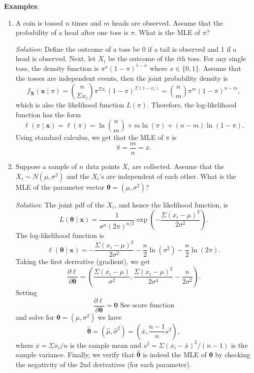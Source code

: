 \documentclass[12pt]{article}
\begin{document}
\textbf{Examples}:
\begin{enumerate}
\item
A coin is tossed $n$ times and $m$ heads are observed.  Assume that the probability of a head after one toss is $\pi$.  What is the MLE of $\pi$?

\emph{Solution}:  Define the outcome of a toss be 0 if a tail is observed and 1 if a head is observed.  Next, let $X_i$ be the outcome of 
the $i$th toss.  For any single toss, the density function is $\pi^x(1-\pi)^{1-x}$ where $x\in \lbrace 0,1\rbrace$.  Assume that the tosses are independent events, then the joint probability density is $$f_{\mathbf{X}}(\boldsymbol{x}\mid\pi)=\binom{n}{\Sigma x_i}\pi^{\Sigma x_i}(1-\pi)^{\Sigma (1-x_i)}=\binom{n}{m}\pi^m(1-\pi)^{n-m},$$
which is also the likelihood function $L(\pi)$.  Therefore, the log-likelihood function has the form $$\ell(\pi\mid\boldsymbol{x})=\ell(\pi)=\operatorname{ln}\binom{n}{m}+m\operatorname{ln}(\pi)+(n-m)\operatorname{ln}(1-\pi).$$  Using standard calculus, we get that the MLE of $\pi$ is $$\hat{\pi}=\frac{m}{n}=\overline{x}.$$

\item
Suppose a sample of $n$ data points $X_i$ are collected.  Assume that the $X_i\sim N(\mu,\sigma^2)$ and the $X_i$'s are independent of each other.  What is the MLE of the parameter vector $\boldsymbol{\theta}=(\mu,\sigma^2)$?

\emph{Solution}:  The joint pdf of the $X_i$, and hence the likelihood function, is $$L(\boldsymbol{\theta}\mid\boldsymbol{x})=\frac{1}{\sigma^n(2\pi)^{n/2}}\operatorname{exp}(-\frac{\Sigma(x_i-\mu)^2}{2\sigma^2}).$$  The log-likelihood function is $$\ell(\boldsymbol{\theta}\mid\boldsymbol{x})=-\frac{\Sigma(x_i-\mu)^2}{2\sigma^2}-\frac{n}{2}\operatorname{ln}(\sigma^2)-\frac{n}{2}\operatorname{ln}(2\pi).$$  Taking the first derivative (gradient), we get $$\frac{\partial\ell}{\partial \boldsymbol{\theta}}=(\frac{\Sigma(x_i-\mu)}{\sigma^2},\frac{\Sigma(x_i-\mu)^2}{2\sigma^4}-\frac{n}{2\sigma^2}).$$  Setting $$\frac{\partial\ell}{\partial \boldsymbol{\theta}}=\boldsymbol{0}\mbox{ See score function}$$ and solve for $\boldsymbol{\theta}=(\mu,\sigma^2)$ we have $$\boldsymbol{\hat{\theta}}=(\hat{\mu},\hat{\sigma}^2)=(\overline{x},\frac{n-1}{n}s^2),$$ where $\overline{x}=\Sigma x_i/n$ is the sample mean and $s^2=\Sigma (x_i-\overline{x})^2/(n-1)$ is the sample variance.  Finally, we verify that $\hat{\boldsymbol{\theta}}$ is indeed the MLE of $\boldsymbol{\theta}$ by checking the negativity of the 2nd derivatives (for each parameter).

\end{enumerate}
\end{document}
